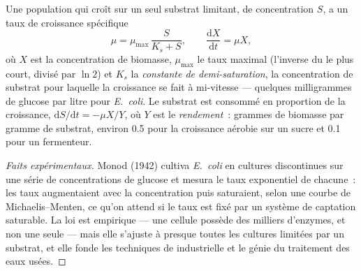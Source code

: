 \begin{theorem}\label{thm:b2:microbial-metabolism:monod}
Une population qui croît sur un seul substrat limitant, de concentration
$S$, a un taux de croissance spécifique
\[
\mu = \mu_{\max}\,\frac{S}{K_s + S}, \qquad \frac{\mathrm{d}X}{\mathrm{d}t} = \mu X,
\]
où $X$ est la concentration de biomasse, $\mu_{\max}$ le taux maximal
(l'inverse du  le plus court, divisé par
$\ln 2$) et $K_s$ la \emph{constante de demi-saturation}, la
concentration de substrat pour laquelle la croissance se fait à
mi-vitesse --- quelques milligrammes de glucose par litre pour
\emph{E.~coli}. Le substrat est consommé en proportion de la croissance,
$\mathrm{d}S/\mathrm{d}t =
-\mu X/Y$, où $Y$ est le \emph{rendement}~: grammes de biomasse par
gramme de substrat, environ \num{0.5} pour la croissance aérobie sur un
sucre et \num{0.1} pour un fermenteur.
\end{theorem}
\begin{proof}[Faits expérimentaux]
Monod (1942) cultiva \emph{E.~coli} en cultures discontinues sur une
série de concentrations de glucose et mesura le taux exponentiel de
chacune~: les taux augmentaient avec la concentration puis saturaient,
selon une courbe de Michaelis--Menten, ce qu'on attend si le taux est
fixé par un système de captation saturable. La loi est empirique --- une
cellule possède des milliers d'enzymes, et non une seule --- mais elle
s'ajuste à presque toutes les cultures limitées par un substrat, et elle
fonde les techniques de  industrielle et le génie du
traitement des eaux usées.
\end{proof}

